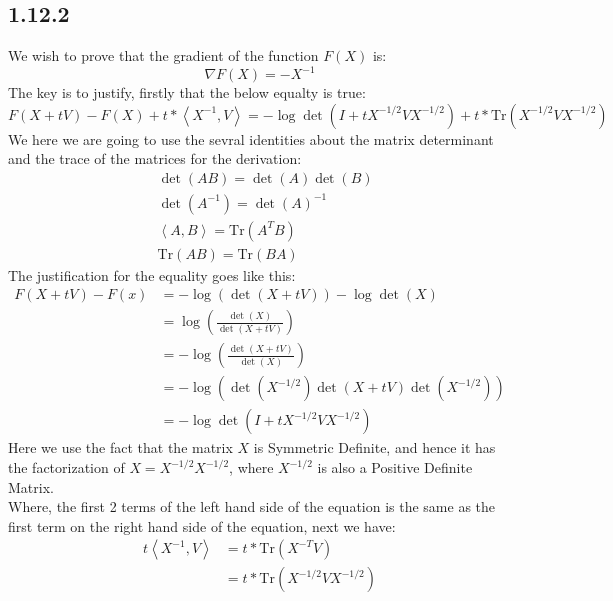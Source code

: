 \documentclass[]{article}
\begin{document}
    \subsection*{1.12.2}
        We wish to prove that the gradient of the function $F(X)$ is: 
        $$
            \nabla F(X) = - X^{-1}
        $$
        The key is to justify, firstly that the below equalty is true: 
        $$
            F(X + tV) - F(X) + t * \left\langle 
                X^{-1}, V
            \right\rangle = 
            -\log\det(I + t X^{-1/2}V X^{-1/2}) + t * \text{Tr}(X^{-1/2}V X^{-1/2})
        $$
        We here we are going to use the sevral identities about the matrix determinant and the trace of the matrices for the derivation: 
        \begin{align*}\tag{1.12.3.1}\label{eqn:1.12.3.1}
            & \det(AB) = \det(A)\det(B)
            \\
            &\det(A^{-1}) = \det(A)^{-1}
            \\
            &
            \left\langle A, B \right\rangle = \text{Tr}(A^TB)
            \\
            & \text{Tr}(AB) = \text{Tr}(BA)
        \end{align*}
        The justification for the equality goes like this: 
        \begin{align*}\tag{1.12.3.2}\label{eqn:1.12.3.2}
            F(X + tV) - F(x) &= -\log(\det(X + tV)) -\log \det(X)       
            \\
            &= \log\left(\frac{\det(X)}{\det(X + tV)}\right)
            \\
            &= 
            - \log\left(
                \frac{\det(X + tV)}{\det(X)}
            \right)
            \\
            &= 
            -\log\left(
                \det(X^{-1/2})\det(X + tV) \det(X^{-1/2})
            \right)
            \\
            &= 
            -\log \det(I + tX^{-1/2}VX^{-1/2})
        \end{align*}
        Here we use the fact that the matrix $X$ is Symmetric Definite, and hence it has the factorization of $X = X^{-1/2}X^{-1/2}$, where $X^{-1/2}$ is also a Positive Definite Matrix. \
        \\
        Where, the first 2 terms of the left hand side of the equation is the same as the first term on the right hand side of the equation, next we have: 
        \begin{align*}\tag{1.12.3.3}\label{eqn:1.12.3.3}
            t \left\langle X^{-1}, V\right\rangle &= t * \text{Tr}(X^{-T}V)
            \\
            &=t* \text{Tr}(X^{-1/2}VX^{-1/2})
        \end{align*}
\end{document}
